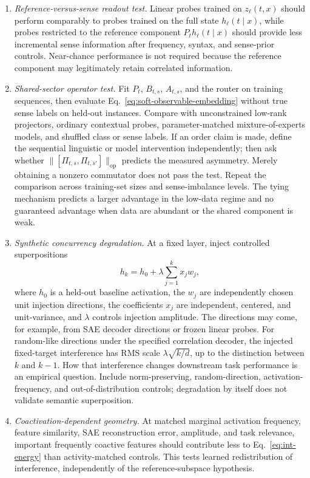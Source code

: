 \documentclass[
  aps,
  reprint,
  superscriptaddress,
  floatfix,
  nofootinbib,
  longbibliography
]{revtex4-2}
\newcommand{\opnorm}[1]{\lVert #1 \rVert_{\mathrm{op}}}
\begin{document}
\begin{enumerate}
\item \emph{Reference-versus-sense readout test.}
Linear probes trained on $z_\ell(t,x)$ should perform comparably to
probes trained on the full state $h_\ell(t\mid x)$, while probes
restricted to the reference component $P_t h_\ell(t\mid x)$ should provide
less incremental sense information after frequency, syntax, and sense-prior
controls.  Near-chance performance is not required because the reference
component may legitimately retain correlated information.

\item \emph{Shared-sector operator test.}
Fit $P_t$, $B_{t,s}$, $A_{t,s}$, and the router on training sequences, then evaluate
Eq.~\eqref{eq:soft-observable-embedding} without true sense labels on held-out
instances. Compare with unconstrained low-rank projectors, ordinary contextual
probes, parameter-matched mixture-of-experts models, and shuffled class or
sense labels.  If an order claim is made, define the sequential linguistic or model
intervention independently; then ask whether
$\opnorm{[\Pi_{t,s},\Pi_{t,s'}]}$ predicts the measured asymmetry.  Merely
obtaining a nonzero commutator does not pass the test.
Repeat the comparison across training-set sizes and sense-imbalance levels.
The tying mechanism predicts a larger advantage in the low-data regime and no
guaranteed advantage when data are abundant or the shared component is weak.

\item \emph{Synthetic concurrency degradation.}
At a fixed layer, inject controlled superpositions
%
\begin{equation}
h_k=h_0+\lambda\sum_{j=1}^k x_j w_j,
\end{equation}
%
where $h_0$ is a held-out baseline activation, the $w_j$ are independently
chosen unit injection directions, the coefficients $x_j$ are independent,
centered, and unit-variance, and $\lambda$ controls injection amplitude.  The
directions may come, for example, from SAE decoder directions or frozen linear
probes.  For random-like directions under the specified correlation decoder,
the injected fixed-target interference has RMS scale
$\lambda\sqrt{k/d}$, up to the distinction between $k$ and $k-1$.
How that interference changes downstream task performance is an empirical
question.  Include norm-preserving, random-direction, activation-frequency,
and out-of-distribution controls; degradation by itself does not validate
semantic superposition.

\item \emph{Coactivation-dependent geometry.}
At matched marginal activation frequency, feature similarity, SAE
reconstruction error, amplitude, and task relevance, important frequently
coactive features should contribute less to Eq.~\eqref{eq:int-energy} than
activity-matched controls.  This tests learned redistribution of interference,
independently of the reference-subspace hypothesis.
\end{enumerate}
\end{document}
